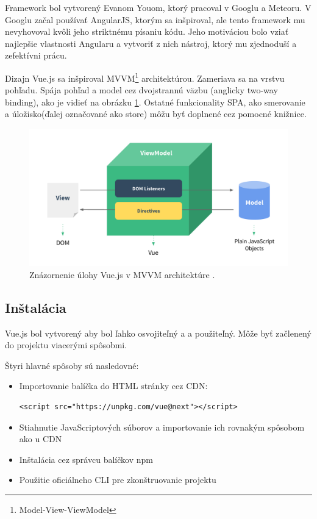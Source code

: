 Framework bol vytvorený Evanom Youom, ktorý pracoval v Googlu a Meteoru. V Googlu začal používať AngularJS, ktorým sa inšpiroval, ale tento framework mu nevyhovoval kvôli jeho striktnému písaniu kódu. Jeho motiváciou bolo vziať najlepšie vlastnosti Angularu a vytvoriť z nich nástroj, ktorý mu zjednoduší a zefektívni prácu.

Dizajn Vue.js sa inšpiroval MVVM\footnote{Model-View-ViewModel} architektúrou. Zameriava sa na vrstvu pohľadu. Spája pohľad a model cez dvojstrannú väzbu (anglicky two-way binding), ako je vidieť na obrázku \ref{pic:mvvm}. Ostatné funkcionality SPA, ako smerovanie a úložisko(ďalej označované ako store) môžu byť doplnené cez pomocné knižnice.
    \begin{figure}[!hbt]
        \centering
        \includegraphics[scale=0.2]{obrazky/mvvm.png}
        \caption{Znázornenie úlohy Vue.js v MVVM architektúre \cite{vue-guide}.}
        \label{pic:mvvm}
    \end{figure}

\subsection*{Inštalácia}
Vue.js bol vytvorený aby bol ľahko osvojiteľný a a použiteľný. Môže byť začlenený do projektu viacerými spôsobmi. 

Štyri hlavné spôsoby sú nasledovné:
    \begin{itemize}
        \item Importovanie balíčka do HTML stránky cez CDN:
        \begin{verbatim}<script src="https://unpkg.com/vue@next"></script>\end{verbatim}
        \item Stiahnutie JavaScriptových súborov a importovanie ich rovnakým spôsobom ako u CDN
        \item Inštalácia cez správcu balíčkov npm
        \item Použitie oficiálneho CLI pre zkonštruovanie projektu
    \end{itemize}
    
